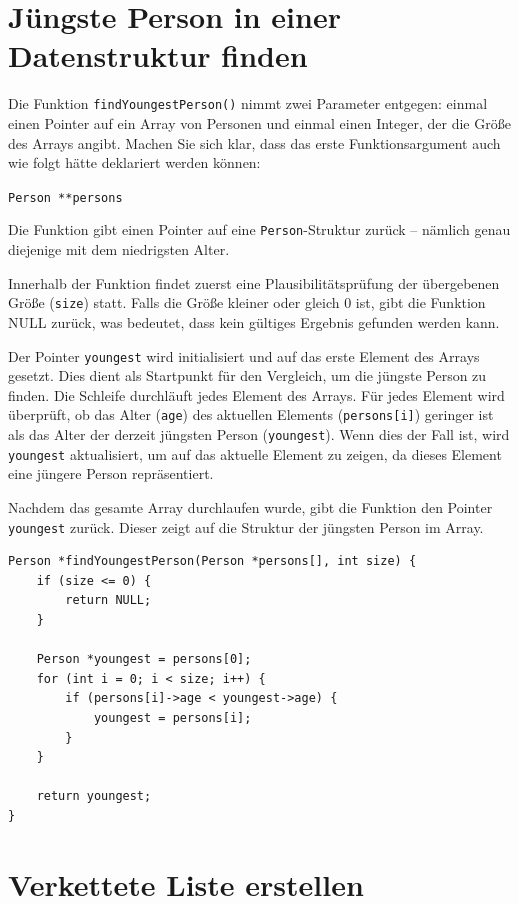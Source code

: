 \chapter{Jüngste Person in einer Datenstruktur finden}

Die Funktion \texttt{findYoungestPerson()} nimmt zwei Parameter entgegen:
einmal einen Pointer auf ein Array von Personen und einmal einen Integer, der
die Größe des Arrays angibt. Machen Sie sich klar, dass das erste
Funktionsargument auch wie folgt hätte deklariert werden können:

\texttt{Person **persons}

Die Funktion gibt einen Pointer auf eine \texttt{Person}-Struktur zurück
-- nämlich genau diejenige mit dem niedrigsten Alter.

Innerhalb der Funktion findet zuerst eine Plausibilitätsprüfung der übergebenen
Größe (\texttt{size}) statt. Falls die Größe kleiner oder gleich 0 ist,
gibt die Funktion NULL zurück, was bedeutet, dass kein gültiges Ergebnis
gefunden werden kann.

Der Pointer \texttt{youngest} wird initialisiert und auf das erste
Element des Arrays gesetzt. Dies dient als Startpunkt für den Vergleich, um die
jüngste Person zu finden. Die Schleife durchläuft jedes Element des Arrays. Für
jedes Element wird überprüft, ob das Alter (\texttt{age}) des aktuellen
Elements (\texttt{persons[i]}) geringer ist als das Alter der derzeit
jüngsten Person (\texttt{youngest}). Wenn dies der Fall ist, wird
\texttt{youngest} aktualisiert, um auf das aktuelle Element zu zeigen, da
dieses Element eine jüngere Person repräsentiert.

Nachdem das gesamte Array durchlaufen wurde, gibt die Funktion den Pointer
\texttt{youngest} zurück. Dieser zeigt auf die Struktur der jüngsten
Person im Array.

\begin{verbatim}
Person *findYoungestPerson(Person *persons[], int size) {
    if (size <= 0) {
        return NULL;
    }

    Person *youngest = persons[0];
    for (int i = 0; i < size; i++) {
        if (persons[i]->age < youngest->age) {
            youngest = persons[i];
        }
    }

    return youngest;
}
\end{verbatim}





\chapter{Verkettete Liste erstellen}

